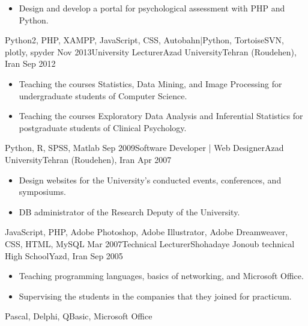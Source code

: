 \begin{experiences}
{\begin{itemize}
      \item Design and develop a portal for psychological assessment with PHP and Python.
    \end{itemize}
  }
    {Python2, PHP, XAMPP, JavaScript, CSS, Autobahn|Python, TortoiseSVN, plotly, spyder}
    \emptySeparator
  \experience
  {Nov 2013}{University Lecturer}{Azad University}{Tehran (Roudehen), Iran}
  {Sep 2012} {
    \begin{itemize}
      \item Teaching the courses Statistics, Data Mining, and Image Processing for undergraduate students of Computer Science.

      \item Teaching the courses Exploratory Data Analysis and Inferential Statistics for postgraduate students of Clinical Psychology.
    \end{itemize}
  }
    {Python, R, SPSS, Matlab}
    \emptySeparator
  \experience
  {Sep 2009}{Software Developer | Web Designer}{Azad University}{Tehran (Roudehen), Iran}
  {Apr 2007} {
    \begin{itemize}
      \item Design websites for the University's conducted events, conferences, and symposiums.

      \item DB administrator of the Research Deputy of the University.
    \end{itemize}
  }
    {JavaScript, PHP, Adobe Photoshop, Adobe Illustrator, Adobe Dreamweaver, CSS, HTML, MySQL}
    \emptySeparator
  \experience
  {Mar 2007}{Technical Lecturer}{Shohadaye Jonoub technical High School}{Yazd, Iran}
  {Sep 2005} {
    \begin{itemize}
      \item Teaching programming languages, basics of networking, and Microsoft Office.

      \item Supervising the students in the companies that they joined for practicum.
    \end{itemize}
  }
    {Pascal, Delphi, QBasic, Microsoft Office}
    \emptySeparator
\end{experiences}
